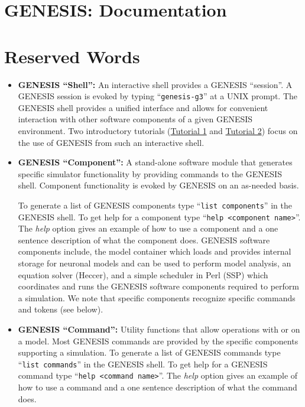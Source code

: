 \documentclass[12pt]{article}
\begin{document}
\section*{GENESIS: Documentation}

\section*{Reserved Words}

\begin{itemize}

\item {\bf GENESIS ``Shell'':} An interactive shell provides a GENESIS ``session''. A GENESIS session is evoked by typing ``{\tt genesis-g3}'' at a UNIX prompt. The GENESIS shell provides a unified interface and allows for convenient interaction with other software components of a given GENESIS environment.  Two introductory tutorials (\href{../tutorial1/tutorial1.tex}{Tutorial 1} and \href{../tutorial2/tutorial2.tex}{Tutorial 2}) focus on the use of GENESIS from such an interactive shell.

\item {\bf GENESIS ``Component'':}  A stand-alone software module that generates specific simulator functionality by providing commands to the GENESIS shell. Component functionality is evoked by GENESIS on an as-needed basis.

To generate a list of GENESIS components type ``{\tt list components}'' in the GENESIS shell. To get help for a component type ``{\tt help <component name>}''. The {\it help} option gives an example of how to use a component and a one sentence description of what the component does. GENESIS software components include, the model container which loads and provides internal storage for neuronal models and can be used to perform model analysis, an equation solver (Heccer), and a simple scheduler in Perl (SSP) which coordinates and runs the GENESIS software components required to perform a simulation. We note that specific components recognize specific commands and tokens (see below).

\item {\bf GENESIS ``Command'':} Utility functions that allow operations with or on a model. Most GENESIS commands are provided by the specific components supporting a simulation. To generate a list of GENESIS commands type ``{\tt list commands}'' in the GENESIS shell. To get help for a GENESIS command type ``{\tt help <command name>}''. The {\it help} option gives an example of how to use a command and a one sentence description of what the command does.


\end{itemize}
\end{document}

